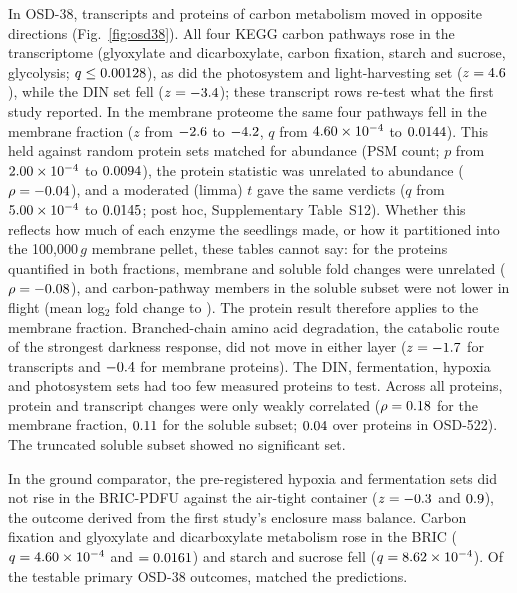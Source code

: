 \documentclass{npjlayout}
\begin{document}
In OSD-38, transcripts and proteins of carbon metabolism moved in opposite directions
(Fig.~\ref{fig:osd38}). All four KEGG carbon pathways rose in the transcriptome (glyoxylate and
dicarboxylate, carbon fixation, starch and sucrose, glycolysis; $q \le 0.00128$), as did the
photosystem and light-harvesting set ($z = 4.6$), while the DIN set fell ($z = -3.4$);
these transcript rows re-test what the first study reported. In the membrane proteome the same four
pathways fell in the membrane fraction ($z$ from $-2.6$ to $-4.2$, $q$ from $4.60\times10^{-4}$
to $0.0144$). This held against random protein sets matched for abundance (PSM count; $p$
from $2.00\times10^{-4}$ to $0.0094$), the protein statistic was unrelated to abundance
($\rho = -0.04$), and a moderated (limma) $t$ gave the same verdicts ($q$ from $5.00\times10^{-4}$
to $0.0145$; post hoc, Supplementary Table~S12). Whether this reflects how much of each
enzyme the seedlings made, or how it partitioned into the 100{,}000\,$g$ membrane pellet, these
tables cannot say: for the \nPartition{} proteins quantified in both fractions, membrane and soluble
fold changes were unrelated ($\rho = -0.08$), and carbon-pathway members in the soluble
subset were not lower in flight (mean log$_2$ fold change \solCarbonFcMin{} to \solCarbonFcMax). The
protein result therefore applies to the membrane fraction.
Branched-chain amino acid degradation, the catabolic route of the strongest darkness response, did
not move in either layer ($z = -1.7$ for transcripts and $-0.4$ for \nMemBcaa{} membrane
proteins). The DIN, fermentation, hypoxia and photosystem sets had too few measured proteins to
test. Across all proteins, protein and transcript changes were only weakly correlated
($\rho = 0.18$ for the membrane fraction, $0.11$ for the soluble subset; $0.04$
over \nFiveTwoTwoProt{} proteins in OSD-522). The truncated soluble subset showed no significant
set.

In the ground comparator, the pre-registered hypoxia and fermentation sets did not rise in the
BRIC-PDFU against the air-tight container ($z = -0.3$ and $0.9$), the outcome derived from
the first study's enclosure mass balance. Carbon fixation and glyoxylate and dicarboxylate
metabolism rose in the BRIC ($q = 4.60\times10^{-4}$ and $= 0.0161$) and starch and sucrose fell ($q = 8.62\times10^{-4}$).
Of the \nOsdTests{} testable primary OSD-38 outcomes, \nOsdMatch{} matched the predictions.
\end{document}
